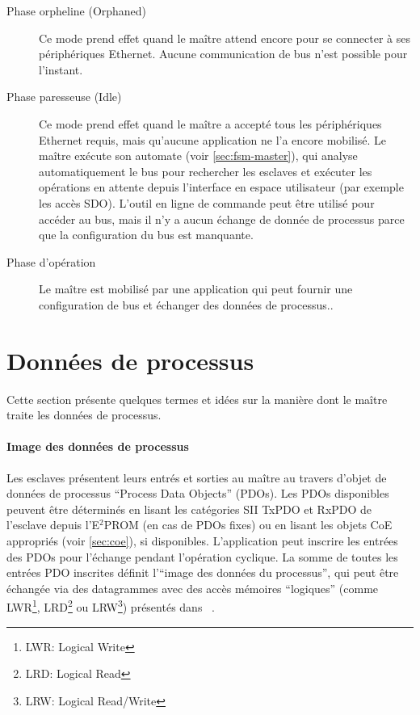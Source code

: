 \documentclass[a4paper,12pt,BCOR6mm,bibtotoc,idxtotoc]{scrbook}
\begin{document}
\begin{description}

\item[Phase orpheline (Orphaned)] Ce mode prend
  effet quand le ma\^itre attend encore pour se connecter \`a ses
  p\'eriph\'eriques Ethernet. Aucune communication de bus n'est possible
  pour l'instant.

\item[Phase paresseuse (Idle)] Ce mode prend effet
  quand le ma\^itre a accept\'e tous les p\'eriph\'eriques Ethernet
  requis, mais qu'aucune application ne l'a encore mobilis\'e. Le
  ma\^itre ex\'ecute son automate (voir \autoref{sec:fsm-master}), qui
  analyse automatiquement le bus pour rechercher les esclaves et
  ex\'ecuter les op\'erations en attente depuis l'interface en espace
  utilisateur (par exemple les acc\`es SDO).  L'outil en ligne de
  commande peut \^etre utilis\'e pour acc\'eder au bus, mais il n'y a
  aucun \'echange de donn\'ee de processus parce que la configuration
  du bus est manquante.

\item[Phase d'op\'eration] Le ma\^itre est
  mobilis\'e par une application qui peut fournir une configuration de
  bus et \'echanger des donn\'ees de processus..

\end{description}


\section{Donn\'ees de processus}
\label{sec:processdata}

Cette section pr\'esente quelques termes et id\'ees sur la mani\`ere
dont le ma\^itre traite les donn\'ees de processus.

\paragraph{Image des donn\'ees de processus}

Les esclaves pr\'esentent leurs entr\'es et sorties au ma\^itre au
travers d'objet de donn\'ees de processus ``Process Data Objects''
(PDOs). Les PDOs disponibles peuvent \^etre d\'etermin\'es
en lisant les cat\'egories SII TxPDO et RxPDO de l'esclave depuis
l'E$^2$PROM (en cas de PDOs fixes) ou en lisant les objets CoE
appropri\'es (voir \autoref{sec:coe}), si disponibles. L'application
peut inscrire les entr\'ees des PDOs pour l'\'echange pendant
l'op\'eration cyclique.  La somme de toutes les entr\'ees PDO
inscrites d\'efinit l'``image des donn\'ees du processus'', qui peut
\^etre \'echang\'ee via des datagrammes avec des acc\`es m\'emoires
``logiques'' (comme LWR\footnote{LWR: Logical Write},
LRD\footnote{LRD: Logical Read} ou LRW\footnote{LRW: Logical
Read/Write}) pr\'esent\'es dans ~\cite[sec.~5.4]{dlspec}.
\end{document}
